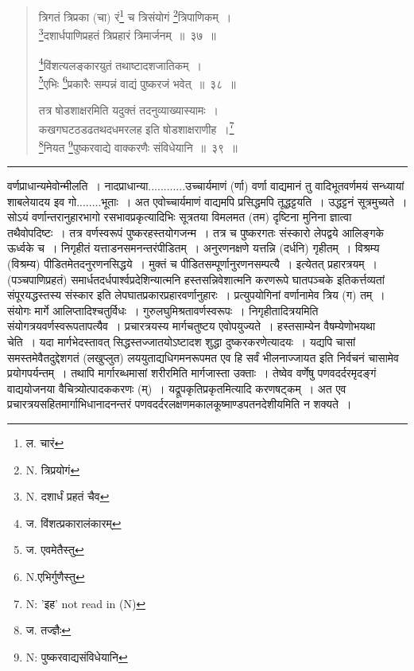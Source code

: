 \documentclass[11pt, openany]{book}
\begin{document}
\begin{quote}
{\na  त्रिगतं त्रिप्रका (चा) रं\renewcommand{\thefootnote}{1}\footnote{ल. चारं} च त्रिसंयोगं \renewcommand{\thefootnote}{1a}\footnote{N. त्रिप्रयोगं}त्रिपाणिकम्~।\\
 \renewcommand{\thefootnote}{1b}\footnote{N. दशार्धं प्रहतं चैव}दशार्धपाणिप्रहतं त्रिप्रहारं त्रिमार्जनम्~॥~३७~॥

 \renewcommand{\thefootnote}{2}\footnote{ज. विंशत्प्रकारालंकारम्}विंशत्यलङ्कारयुतं तथाष्टादशजातिकम्~।\\
 \renewcommand{\thefootnote}{3}\footnote{ज. एवमेतैस्तु}एभिः \renewcommand{\thefootnote}{3a}\footnote{N.एभिर्गुणैस्तु}प्रकारैः सम्पन्नं वाद्यं पुष्करजं भवेत्~॥~३८~॥

 तत्र षोडशाक्षरमिति यदुक्तं तदनुव्याख्यास्यामः~।\\
 कखगघटठडढतथदधमरलह इति षोडशाक्षराणीह~।\renewcommand{\thefootnote}{4a}\footnote{N: 'इह' not read in (N)}\\
 \renewcommand{\thefootnote}{4}\footnote{ज. तज्ज्ञैः}नियत \renewcommand{\thefootnote}{4b}\footnote{N: पुष्करवाद्यसंविधेयानि}पुष्करवाद्ये वाक्करणैः संविधेयानि~॥~३९~॥}
\end{quote}

\hrule

\vspace{2mm}
\noindent
वर्णप्राधान्यमेवोन्मीलति~। नादप्राधान्या............उच्चार्यमाणं (र्णा)  वर्णा वाद्यमानं तु वादिभूतवर्णमयं सन्ध्यायां  शाबलेयादय इव गो........भूताः~। अत एवोच्चार्यमाणं वाद्यमपि प्रसिद्धमपि तूद्धट्टयति~। उद्धट्टनं सूत्रमुच्यते~। सोऽयं वर्णान्तरानुहारभागो रसभावप्रकृत्यादिभिः सूत्रतया विमलमत (तम) दृष्टिना मुनिना ज्ञात्वा तथैवोपदिष्टः~। तत्र वर्णस्वरूपं पुष्करहस्तयोगजन्म~। तत्र च पुष्करगतः संस्कारो लेपद्वये आलिङ्गके ऊर्ध्वके च~। निगृहीतं यत्ताडनसमनन्तरंपीडितम्~। अनुरणनक्षणे यत्तन्नि (दर्धनि) गृहीतम्~। विश्रम्य (विश्रम्य) पीडितमेतदनुरणनसिद्धये~। मुक्तं च पीडितसम्पूर्णानुरणनसम्पत्यै~। इत्येतत् प्रहारत्रयम्~।  (पञ्चपाणिप्रहतं) समार्धतदर्धपार्श्वप्रदेशिन्यात्मनि हस्तसन्निवेशात्मनि करणरूपे घातपञ्चके इतिकर्त्तव्यतां संपूरयद्धस्तस्य संस्कार इति लेपघातप्रकारप्रहारवर्णानुहारः~। प्रत्युपयोगिनां वर्णानामेव त्रिय (ग) तम्~। संयोगः मार्गे आलिप्तादिश्चतुर्विधः~। {\qtt गुरुलघुमिश्रतावर्णस्वरूपः}~। निगृहीतादित्रयमिति संयोगत्रयवर्णस्वरूपतापत्यैव~। प्रचारत्रयस्य मार्गचतुष्टय एवोपयुज्यते~। हस्तसाम्येन वैषम्येणोभयथा चेति~। यदा मार्गभेदस्तावत् सिद्धस्तज्जातयोऽष्टादश शुद्धा दुष्करकरणेत्यादयः~। यद्यपि चासां समस्तमेवैतदुद्देशगतं (लखुप्लुत) लययुताद्यधिगमनरूपमत एव हि सर्वं भीलनाज्जायत इति निर्वचनं चासामेव प्रयोगपर्यन्तम्~। तथापि मार्गारब्धमासां शरीरमिति मार्गजास्ता उक्ताः~। तेष्वेव वर्णेषु पणवदर्दरमृदङ्गं वाद्ययोजनया वैचित्र्योत्पादककरणः (म्)~। यद्रूपकृतिप्रकृतमित्यादि करणषट्कम्~। अत एव प्रचारत्रयसहितमार्गाभिधानादनन्तरं पणवदर्दरलक्षणमकालकूष्माण्डपतनदेशीयमिति न शक्यते~।\\
\end{document}
